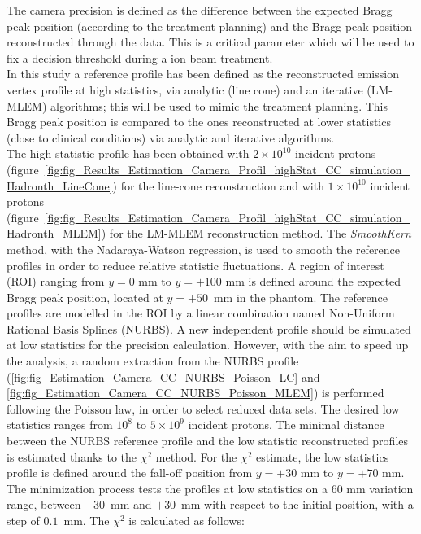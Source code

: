 The camera precision is defined as the difference between the expected Bragg peak position (according to the treatment planning) and the Bragg peak position reconstructed through the data. This is a critical parameter which will be used to fix a decision threshold during a ion beam treatment.\\ 
In this study a reference profile has been defined as the reconstructed emission vertex profile at high statistics, via analytic (line cone) and an iterative (LM-MLEM) algorithms; this will be used to mimic the treatment planning. This Bragg peak position is compared to the ones reconstructed at lower statistics (close to clinical conditions) via analytic and iterative algorithms.\\
The high statistic profile has been obtained with $2\times10^{10}$ incident protons (figure~\ref{fig:fig_Results_Estimation_Camera_Profil_highStat_CC_simulation_Hadronth_LineCone}) for the line-cone reconstruction and with $1\times10^{10}$ incident protons (figure~\ref{fig:fig_Results_Estimation_Camera_Profil_highStat_CC_simulation_Hadronth_MLEM}) for the LM-MLEM reconstruction method. The \textit{SmoothKern} method, with the Nadaraya-Watson regression, is used to smooth the reference profiles in order to reduce relative statistic fluctuations.\newline
A region of interest (ROI) ranging from $y=0$ mm to $y=+100$ mm is defined around the expected Bragg peak position, located at $y=+50$~mm in the phantom. The reference profiles are modelled in the ROI by a linear combination named Non-Uniform Rational Basis Splines (NURBS). \newline
A new independent profile should be simulated at low statistics for the precision calculation. However, with the aim to speed up the analysis, a random extraction from the NURBS profile (\ref {fig:fig_Estimation_Camera_CC_NURBS_Poisson_LC} and \ref {fig:fig_Estimation_Camera_CC_NURBS_Poisson_MLEM}) is performed following the Poisson law, in order to select reduced data sets. The desired low statistics ranges from $10^8$ to $5\times10^9$ incident protons.\newline
The minimal distance between the NURBS reference profile and the low statistic reconstructed profiles is estimated thanks to the $\chi^2$ method. For the $\chi^2$ estimate, the low statistics profile is defined around the fall-off position from $y=+30$ mm to $y=+70$ mm. The minimization process tests the profiles at low statistics on a 60 mm variation range, between $-30$~mm and $+30$~mm with respect to the initial position, with a step of $0.1$~mm. The      $\chi^2$ is calculated as follows:

